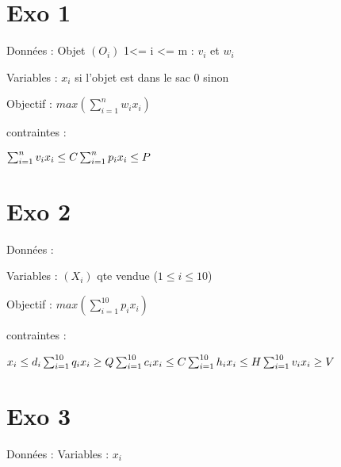 \documentclass[varwidth,margin=3mm]{standalone}
\begin{document}
\section{Exo 1}
Données : Objet $(O_i)$ 1<= i <= m : $v_i $ et $w_i$

Variables : $x_i$  si l'objet est dans le sac 0 sinon

Objectif : $max(\sum_{i=1}^{n}w_i x_i)$

contraintes :

\begin{math}
    \sum_{i=1}^{n}v_i x_i \le C \\
    \sum_{i=1}^{n}p_i x_i \le P
\end{math}




\section{Exo 2}

Données :

Variables : $(X_i)$ qte vendue ($ 1 \le i \le 10$)

Objectif : $max(\sum_{i=1}^{10}p_i x_i)$

contraintes :

\begin{math}
    x_i \le d_i \\
    \sum_{i=1}^{10}q_i x_i \ge Q \\
    \sum_{i=1}^{10}c_i x_i \le C \\
    \sum_{i=1}^{10}h_i x_i \le H \\
    \sum_{i=1}^{10}v_i x_i \ge V
\end{math}

\section{Exo 3}

Données :
Variables : $x_i$
\end{document}
